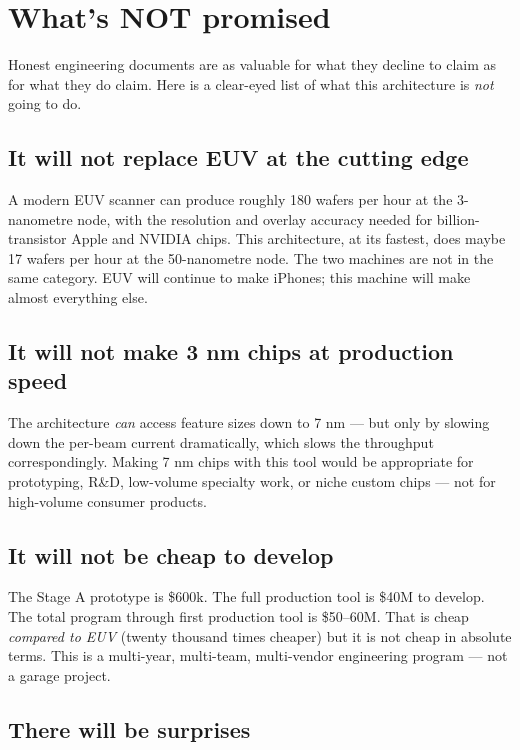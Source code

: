\documentclass[11pt,letterpaper]{article}
\begin{document}
\section{What's NOT promised}

Honest engineering documents are as valuable for what they decline to claim as for what they do claim. Here is a clear-eyed list of what this architecture is \emph{not} going to do.

\subsection{It will not replace EUV at the cutting edge}

A modern EUV scanner can produce roughly 180 wafers per hour at the 3-nanometre node, with the resolution and overlay accuracy needed for billion-transistor Apple and NVIDIA chips. This architecture, at its fastest, does maybe 17 wafers per hour at the 50-nanometre node. The two machines are not in the same category. EUV will continue to make iPhones; this machine will make almost everything else.

\subsection{It will not make 3 nm chips at production speed}

The architecture \emph{can} access feature sizes down to 7 nm --- but only by slowing down the per-beam current dramatically, which slows the throughput correspondingly. Making 7 nm chips with this tool would be appropriate for prototyping, R\&D, low-volume specialty work, or niche custom chips --- not for high-volume consumer products.

\subsection{It will not be cheap to develop}

The Stage A prototype is \$600k. The full production tool is \$40M to develop. The total program through first production tool is \$50--60M. That is cheap \emph{compared to EUV} (twenty thousand times cheaper) but it is not cheap in absolute terms. This is a multi-year, multi-team, multi-vendor engineering program --- not a garage project.

\subsection{There will be surprises}
\end{document}
